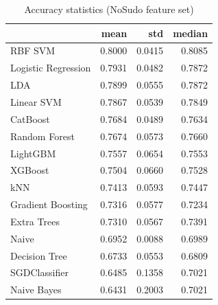 \begin{table}
\caption{Accuracy statistics (NoSudo feature set)}
\label{tab:accuracy_NoSudo_stats}
\begin{tabular}{lrrr}
\toprule
 & mean & std & median \\
\midrule
RBF SVM & 0.8000 & 0.0415 & 0.8085 \\
Logistic Regression & 0.7931 & 0.0482 & 0.7872 \\
LDA & 0.7899 & 0.0555 & 0.7872 \\
Linear SVM & 0.7867 & 0.0539 & 0.7849 \\
CatBoost & 0.7684 & 0.0489 & 0.7634 \\
Random Forest & 0.7674 & 0.0573 & 0.7660 \\
LightGBM & 0.7557 & 0.0654 & 0.7553 \\
XGBoost & 0.7504 & 0.0660 & 0.7528 \\
kNN & 0.7413 & 0.0593 & 0.7447 \\
Gradient Boosting & 0.7316 & 0.0577 & 0.7234 \\
Extra Trees & 0.7310 & 0.0567 & 0.7391 \\
Naive & 0.6952 & 0.0088 & 0.6989 \\
Decision Tree & 0.6733 & 0.0553 & 0.6809 \\
SGDClassifier & 0.6485 & 0.1358 & 0.7021 \\
Naive Bayes & 0.6431 & 0.2003 & 0.7021 \\
\bottomrule
\end{tabular}
\end{table}
